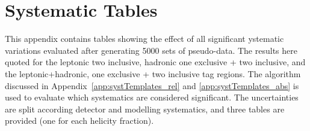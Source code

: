 \clearpage
\section{Systematic Tables}
\label{app:systTables}
This appendix contains tables showing the effect of all significant ystematic variations evaluated after generating 5000 sets of pseudo-data. The results here quoted for the leptonic two inclusive, hadronic one exclusive + two inclusive, and the leptonic+hadronic, one exclusive + two inclusive \bt tag regions. The algorithm discussed in Appendix~\ref{app:systTemplates_rel} and \ref{app:systTemplates_abs} is used to evaluate which systematics are considered significant. The uncertainties are split according detector and modelling systematics, and three tables are provided (one for each helicity fraction).


